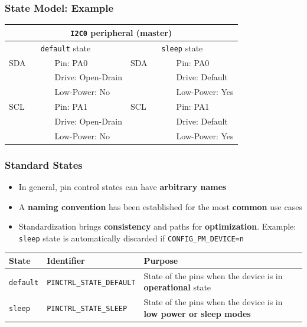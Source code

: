 \documentclass[handout]{beamer}
\newcommand{\tabitem}{~~\llap{\textbullet}~~}
\begin{document}
\begin{frame}
  \frametitle{State Model: Example}

  \begin{table}
    \centering
    \begin{tabular}{llll}
      \toprule
      \multicolumn{4}{c}{\texttt{I2C0} peripheral (master)}                          \\
      \midrule
      \multicolumn{2}{c}{\texttt{default} state}%
          & \multicolumn{2}{c}{\texttt{sleep} state}                                 \\
      \midrule
      SDA & \tabitem~Pin: PA0                        & SDA & \tabitem~Pin: PA0       \\
          & \tabitem~Drive: Open-Drain               &     & \tabitem~Drive: Default \\
          & \tabitem~Low-Power: No                   &     & \tabitem~Low-Power: Yes \\
      \midrule
      SCL & \tabitem~Pin: PA1                        & SCL & \tabitem~Pin: PA1       \\
          & \tabitem~Drive: Open-Drain               &     & \tabitem~Drive: Default \\
          & \tabitem~Low-Power: No                   &     & \tabitem~Low-Power: Yes \\
      \bottomrule
    \end{tabular}
  \end{table}
\end{frame}

\begin{frame}
  \frametitle{Standard States}

  \begin{itemize}
    \item<1-> In general, pin control states can have \textbf{arbitrary names}
    \item<2-> A \textbf{naming convention} has been established for the most
          \textbf{common} use cases
    \item<3-> Standardization brings \textbf{consistency} and paths for
          \textbf{optimization}. Example: \texttt{sleep} state is automatically
          discarded if \texttt{CONFIG\_PM\_DEVICE=n}
  \end{itemize}

  \begin{adjustwidth}{-0.6cm}{}
    \begin{tabular}{p{}p{}p{}}
      \toprule
      State            & Identifier                       & Purpose                                                                   \\
      \midrule
      \texttt{default} & \texttt{PINCTRL\_STATE\_DEFAULT} & State of the pins when the device is in \textbf{operational} state        \\
      \texttt{sleep}   & \texttt{PINCTRL\_STATE\_SLEEP}   & State of the pins when the device is in \textbf{low power or sleep modes} \\
      \bottomrule
    \end{tabular}
  \end{adjustwidth}
\end{frame}
\end{document}
